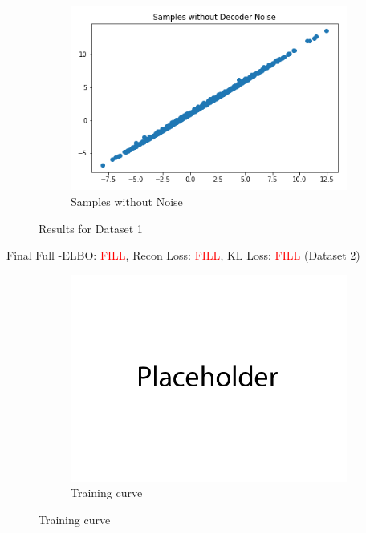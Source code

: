\documentclass{article}
\begin{document}
\begin{enumerate}[(a)]
\begin{figure}[H]
    \begin{subfigure}{0.32\textwidth}
        \centering
        \includegraphics[width=\textwidth]{figures/q1_a_dset1_sample_without_noise.png}
        \caption{Samples without Noise}
    \end{subfigure}
    \caption{Results for Dataset 1}
\end{figure}
Final Full -ELBO: \textcolor{red}{FILL}, Recon Loss: \textcolor{red}{FILL}, KL Loss: \textcolor{red}{FILL} (Dataset 2)
\begin{figure}[H]
    \centering
    \begin{subfigure}{0.32\textwidth}
        \centering
        \includegraphics[width=\textwidth]{figures/q1_a_dset2_train_plot.png}
        \caption{Training curve}
    \end{subfigure}

\end{figure}
\end{enumerate}
\end{document}
